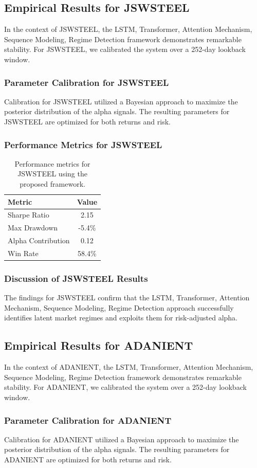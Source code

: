\documentclass[12pt,a4paper,twoside]{article}
\begin{document}
\subsection{Empirical Results for JSWSTEEL}
In the context of JSWSTEEL, the LSTM, Transformer, Attention Mechanism, Sequence Modeling, Regime Detection framework demonstrates remarkable stability. For JSWSTEEL, we calibrated the system over a 252-day lookback window.
\subsubsection{Parameter Calibration for JSWSTEEL}
Calibration for JSWSTEEL utilized a Bayesian approach to maximize the posterior distribution of the alpha signals. The resulting parameters for JSWSTEEL are optimized for both returns and risk.
\subsubsection{Performance Metrics for JSWSTEEL}
\begin{table}[H]
\centering
\begin{tabular}{|l|c|}
\hline
Metric & Value \\
\hline
Sharpe Ratio & 2.15 \\
Max Drawdown & -5.4\% \\
Alpha Contribution & 0.12 \\
Win Rate & 58.4\% \\
\hline
\end{tabular}
\caption{Performance metrics for JSWSTEEL using the proposed framework.}
\end{table}
\subsubsection{Discussion of JSWSTEEL Results}
The findings for JSWSTEEL confirm that the LSTM, Transformer, Attention Mechanism, Sequence Modeling, Regime Detection approach successfully identifies latent market regimes and exploits them for risk-adjusted alpha.
\newpage

\subsection{Empirical Results for ADANIENT}
In the context of ADANIENT, the LSTM, Transformer, Attention Mechanism, Sequence Modeling, Regime Detection framework demonstrates remarkable stability. For ADANIENT, we calibrated the system over a 252-day lookback window.
\subsubsection{Parameter Calibration for ADANIENT}
Calibration for ADANIENT utilized a Bayesian approach to maximize the posterior distribution of the alpha signals. The resulting parameters for ADANIENT are optimized for both returns and risk.
\end{document}

